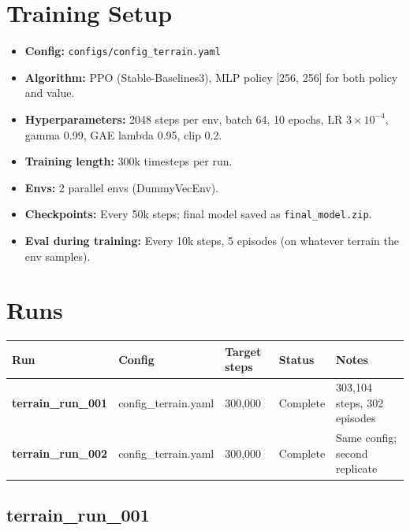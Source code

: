 \documentclass[11pt]{article}
\begin{document}
\section{Training Setup}

\begin{itemize}
  \item \textbf{Config:} \texttt{configs/config\_terrain.yaml}
  \item \textbf{Algorithm:} PPO (Stable-Baselines3), MLP policy [256, 256] for both policy and value.
  \item \textbf{Hyperparameters:} 2048 steps per env, batch 64, 10 epochs, LR $3\times10^{-4}$, gamma 0.99, GAE lambda 0.95, clip 0.2.
  \item \textbf{Training length:} 300k timesteps per run.
  \item \textbf{Envs:} 2 parallel envs (DummyVecEnv).
  \item \textbf{Checkpoints:} Every 50k steps; final model saved as \texttt{final\_model.zip}.
  \item \textbf{Eval during training:} Every 10k steps, 5 episodes (on whatever terrain the env samples).
\end{itemize}

\section{Runs}

\begin{table}[h]
  \centering
  \begin{tabular}{lllll}
    \toprule
    Run & Config & Target steps & Status & Notes \\
    \midrule
    \textbf{terrain\_run\_001} & config\_terrain.yaml & 300,000 & Complete & 303,104 steps, 302 episodes \\
    \textbf{terrain\_run\_002} & config\_terrain.yaml & 300,000 & Complete & Same config; second replicate \\
    \bottomrule
  \end{tabular}
\end{table}

\subsection{terrain\_run\_001}
\end{document}

